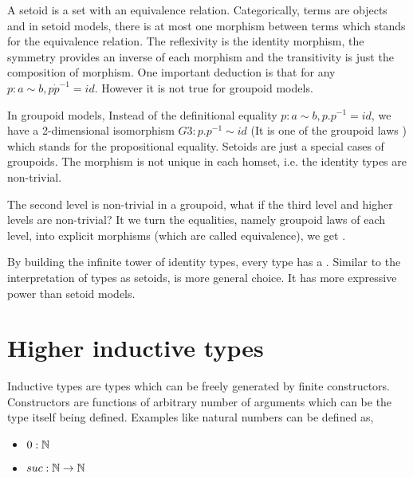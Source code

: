 A setoid is a set with
an equivalence relation. Categorically, terms are objects and in setoid models, there is at most one morphism
between terms which stands for the equivalence relation.
The reflexivity is the identity morphism, the symmetry provides an
inverse of each morphism and the transitivity is just the composition
of morphism. One important deduction is that for any $p : a \sim b, p
\dot p^{-1} = id$. However it is not true for groupoid models.

In groupoid models, Instead of the definitional equality $p : a \sim
b, p . p^{-1} = id$, we have a 2-dimensional isomorphism $G3 : p . p^{-1}
\sim id$ (It is one of the groupoid laws \cite{MR1686862}) which
stands for the propositional equality.
Setoids are just a special cases of groupoids. The morphism is not
unique in each homset, i.e. the identity types are
non-trivial.

The second level is non-trivial in a groupoid, what if the third level
and higher levels are non-trivial? It we turn the equalities, namely
groupoid laws of each level, into explicit morphisms (which are called
equivalence), we get \og.

By building the infinite tower of identity types, every type has a \wog \cite{van2011types}.
Similar to the interpretation of types as setoids, \wog is more
general choice. It has more expressive power than setoid models.


\section{Higher inductive types}

Inductive types are types which can be freely generated by finite
constructors. Constructors are functions of arbitrary number of
arguments which can be the type itself being defined. Examples like
natural numbers can be defined as,

\begin{itemize}
\item $0 : \mathbb{N}$
\item $suc : \mathbb{N} \rightarrow \mathbb{N}$
\end{itemize}


